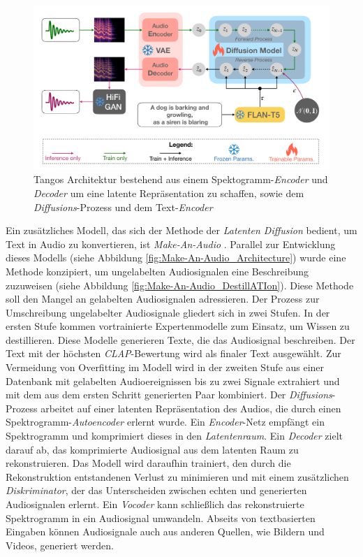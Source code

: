 \documentclass[
  a4paper,  %
  twoside,  %
  bibliography=totoc,
  headsepline,
  cleardoublepage=empty,
  parskip=half,
  draft=false
]{scrbook}
\begin{document}
\begin{figure}[h]
  \centering
  \includegraphics[width=.7\textwidth]{graphics/Tango.png}
  \caption[Tango Architektur]{Tangos Architektur bestehend aus einem Spektogramm-\emph{Encoder} und \emph{Decoder} um eine latente Repräsentation zu schaffen, sowie dem \emph{Diffusions}-Prozess und dem Text-\emph{Encoder} \cite{liu_roberta_2019}}
  \label{fig:tango}
\end{figure}

Ein zusätzliches Modell, das sich der Methode der \emph{Latenten Diffusion} \cite{rombach_high-resolution_2022} bedient, um Text in Audio zu konvertieren, ist \emph{Make-An-Audio} \cite{huang_make--audio_2023}. Parallel zur Entwicklung dieses Modells (siehe Abbildung \ref{fig:Make-An-Audio_Architecture}) wurde eine Methode konzipiert, um ungelabelten Audiosignalen eine Beschreibung zuzuweisen (siehe Abbildung \ref{fig:Make-An-Audio_DestillATIon}). Diese Methode soll den Mangel an gelabelten Audiosignalen adressieren. Der Prozess zur Umschreibung ungelabelter Audiosignale gliedert sich in zwei Stufen. In der ersten Stufe kommen vortrainierte Expertenmodelle \cite{xu_crnn-gru_2020, deshmukh_audio_2022, koepke_audio_2023} zum Einsatz, um Wissen zu destillieren. Diese Modelle generieren Texte, die das Audiosignal beschreiben. Der Text mit der höchsten \emph{CLAP}-Bewertung \cite{elizalde_clap_2022} wird als finaler Text ausgewählt. Zur Vermeidung von Overfitting im Modell wird in der zweiten Stufe aus einer Datenbank mit gelabelten Audioereignissen bis zu zwei Signale extrahiert und mit dem aus dem ersten Schritt generierten Paar kombiniert. Der \emph{Diffusions}-Prozess arbeitet auf einer latenten Repräsentation des Audios, die durch einen Spektrogramm-\emph{Autoencoder} erlernt wurde. Ein \emph{Encoder}-Netz empfängt ein Spektrogramm und komprimiert dieses in den \emph{Latentenraum}. Ein \emph{Decoder} zielt darauf ab, das komprimierte Audiosignal aus dem latenten Raum zu rekonstruieren. Das Modell wird daraufhin trainiert, den durch die Rekonstruktion entstandenen Verlust zu minimieren und mit einem zusätzlichen \emph{Diskriminator}, der das Unterscheiden zwischen echten und generierten Audiosignalen erlernt. Ein \emph{Vocoder} kann schließlich das rekonstruierte Spektrogramm in ein Audiosignal umwandeln. Abseits von textbasierten Eingaben können Audiosignale auch aus anderen Quellen, wie Bildern und Videos, generiert werden.
 
\end{document}
